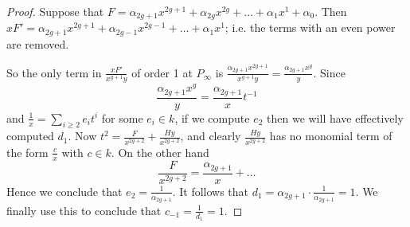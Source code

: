 \documentclass[draft, 11pt]{article} %
\theoremstyle{plain}
\theoremstyle{remark}
\begin{document}
\begin{proof}
Suppose that $F = \alpha_{2g+1}x^{2g+1} + \alpha_{2g}x^{2g} + \ldots + \alpha_1x^1 + \alpha_0$.
Then $xF'= \alpha_{2g+1}x^{2g+1} + \alpha_{2g-1}x^{2g-1} + \ldots + \alpha_1x^1$; i.e. the terms with an even power are removed.

So the only term in $\frac{xF'}{x^{g+1}y}$ of order 1 at $P_\infty$ is $\frac{\alpha_{2g+1}x^{2g+1}}{x^{g+1}y} = \frac{\alpha_{2g+1}x^{g}}{y}$.
Since
\[
\frac{\alpha_{2g+1}x^g}{y} = \frac{\alpha_{2g+1}}{x}t^{-1}
\]
and $\frac{1}{x} = \sum_{i\geq 2}e_it^i$ for some $e_i \in k$, if we compute $e_2$ then we will have effectively computed $d_1$.
Now $t^2 = \frac{F }{x^{2g+2}}+ \frac{Hy}{x^{2g+2}}$, and clearly $\frac{Hy}{x^{2g+2}}$ has no monomial term of the form $\frac{c}{x}$ with $c \in k$.
On the other hand
\[
\frac{F}{x^{2g+2}} = \frac{\alpha_{2g+1}}{x} + \ldots
\]
Hence we conclude that $e_2 = \frac{1}{\alpha_{2g+1}}$.
It follows that $d_1 = \alpha_{2g+1} \cdot \frac{1}{\alpha_{2g+1}} = 1$.
We finally use this to conclude that $c_{-1} = \frac{1}{d_{1}} = 1$.




\end{proof}
\end{document}

